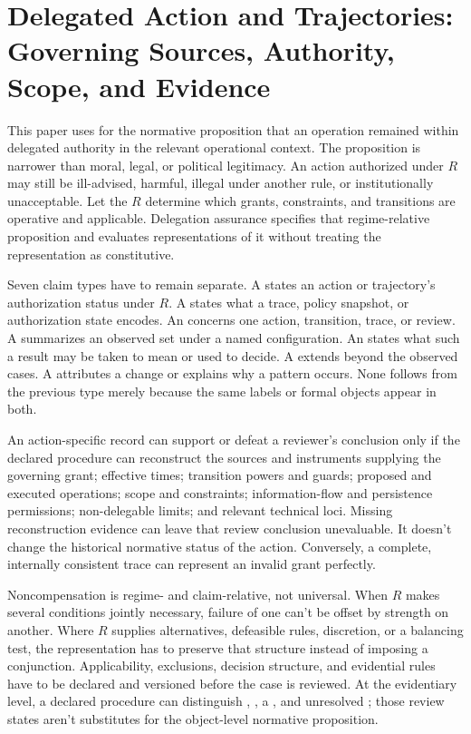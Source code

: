 \section[Delegated Action and Trajectories]{Delegated Action and Trajectories: Governing Sources, Authority, Scope, and Evidence}

This paper uses  for the normative proposition that an operation remained within delegated authority in the relevant operational context. The proposition is narrower than moral, legal, or political legitimacy. An action authorized under \(R\) may still be ill-advised, harmful, illegal under another rule, or institutionally unacceptable. Let the  \(R\) determine which grants, constraints, and transitions are operative and applicable. Delegation assurance specifies that regime-relative proposition and evaluates representations of it without treating the representation as constitutive.

Seven claim types have to remain separate. A  states an action or trajectory's authorization status under \(R\). A  states what a trace, policy snapshot, or authorization state encodes. An  concerns one action, transition, trace, or review. A  summarizes an observed set under a named configuration. An  states what such a result may be taken to mean or used to decide. A  extends beyond the observed cases. A  attributes a change or explains why a pattern occurs. None follows from the previous type merely because the same labels or formal objects appear in both.

An action-specific record can support or defeat a reviewer's conclusion only if the declared procedure can reconstruct the sources and instruments supplying the governing grant; effective times; transition powers and guards; proposed and executed operations; scope and constraints; information-flow and persistence permissions; non-delegable limits; and relevant technical loci. Missing reconstruction evidence can leave that review conclusion unevaluable. It doesn't change the historical normative status of the action. Conversely, a complete, internally consistent trace can represent an invalid grant perfectly.

Noncompensation is regime- and claim-relative, not universal. When \(R\) makes several conditions jointly necessary, failure of one can't be offset by strength on another. Where \(R\) supplies alternatives, defeasible rules, discretion, or a balancing test, the representation has to preserve that structure instead of imposing a conjunction. Applicability, exclusions, decision structure, and evidential rules have to be declared and versioned before the case is reviewed. At the evidentiary level, a declared procedure can distinguish , , a , and unresolved ; those review states aren't substitutes for the object-level normative proposition.


